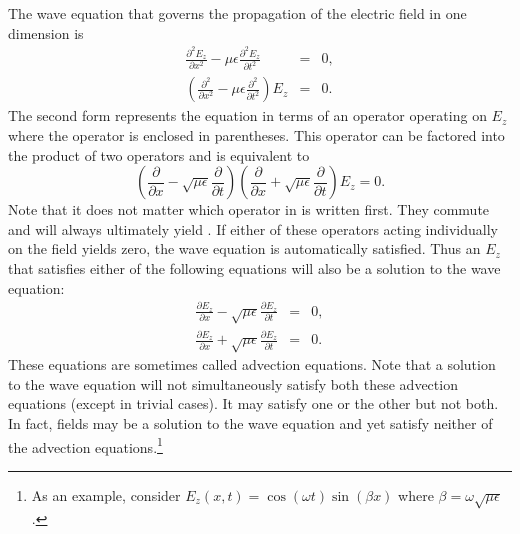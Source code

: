 The wave equation that governs the propagation of the electric field
in one dimension is
\begin{eqnarray}
  \frac{\partial^2 E_z}{\partial x^2}
  - \mu\epsilon \frac{\partial^2 E_z}{\partial t^2} &=& 0,
  \label{eq:waveEqOneD}
 \\
  \left(\frac{\partial^2}{\partial x^2}
  - \mu\epsilon \frac{\partial^2}{\partial t^2}\right) E_z &=& 0.
\end{eqnarray}
The second form represents the equation in terms of an operator
operating on $E_z$ where the operator is enclosed in parentheses.
This operator can be factored into the product of two operators and is
equivalent to
\begin{equation}
  \left(\frac{\partial }{\partial x}
  -\sqrt{\mu\epsilon} \frac{\partial }{\partial t}\right)
  \left(\frac{\partial }{\partial x}
  +\sqrt{\mu\epsilon} \frac{\partial }{\partial t}\right)
  E_z
  = 0.
  \label{eq:factoredWaveEq}
\end{equation}
Note that it does not matter which operator in
 is written first.  They commute and will
always ultimately yield .  If either of these
operators acting individually on the field yields zero, the wave
equation is automatically satisfied.  Thus an $E_z$ that satisfies
either of the following equations will also be a solution to the wave
equation:
\begin{eqnarray}
  \frac{\partial E_z}{\partial x}
  - \sqrt{\mu\epsilon} \frac{\partial E_z}{\partial t} &=& 0, 
  \label{eq:advection}
  \\
  \frac{\partial E_z}{\partial x}
  + \sqrt{\mu\epsilon} \frac{\partial E_z}{\partial t}
  &=& 0.
  \label{eq:advectionI}
\end{eqnarray}
These equations are sometimes called advection equations.  Note that a
solution to the wave equation will not simultaneously satisfy both
these advection equations (except in trivial cases).  It may satisfy
one or the other but not both.  In fact, fields may be a solution to
the wave equation and yet satisfy neither of the advection
equations.\footnote{As an example, consider $E_z(x,t) = \cos(\omega
  t)\sin(\beta x)$ where $\beta = \omega\sqrt{\mu\epsilon}$.}

